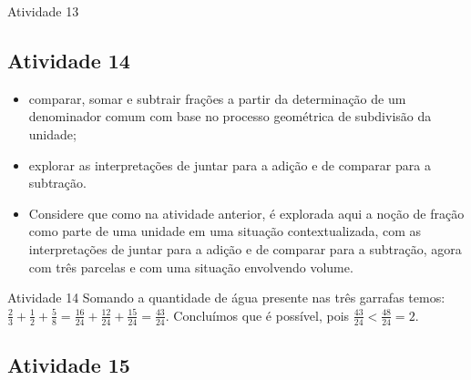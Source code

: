 \begin{multicols}{2}
\begin{resposta*}{Atividade 13}
\begin{enumerate} [\quad a)]
\end{enumerate} %

\end{resposta*}

\subsection{Atividade 14}

  \newline \vspace{.15cm}  

  \begin{itemize} %
    \item       comparar, somar e subtrair frações a partir da determinação de um denominador comum com base no processo geométrica de subdivisão da unidade;
    \item       explorar as interpretações de juntar para a adição e de comparar para a subtração.
\end{itemize} %
  
   \vspace{.15cm}  

  \begin{itemize} %
    \item       Considere que como na atividade anterior, é explorada aqui a noção de fração como parte de uma unidade em uma situação contextualizada, com as interpretações de juntar para a adição e de comparar para a subtração, agora com três parcelas e com uma situação envolvendo volume.
\end{itemize} %
  
\begin{resposta*}{Atividade 14}  
  Somando a quantidade de água presente nas três garrafas temos:   $\frac{2}{3}+\frac{1}{2}+\frac{5}{8} = \frac{16}{24}+\frac{12}{24}+\frac{15}{24} = \frac{43}{24}$. Concluímos que é possível, pois   $\frac{43}{24}<\frac{48}{24}=2$.    
\end{resposta*}

\clearpage

\subsection{Atividade 15}
  
  \newline \vspace{.15cm}  


\end{multicols}
